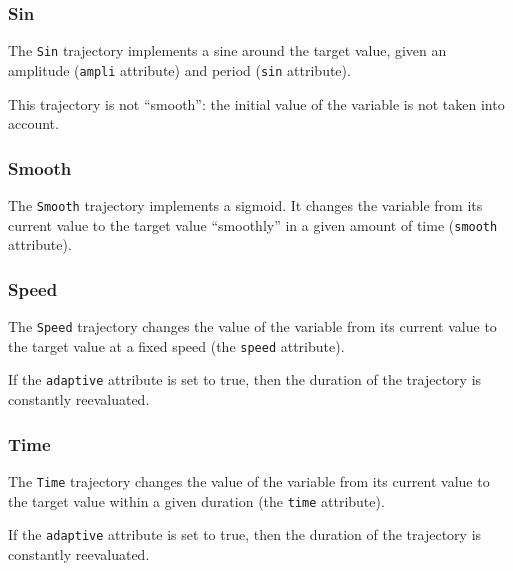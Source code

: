 
\subsubsection{Sin}

The \lstinline{Sin} trajectory implements a sine around the target
value, given an amplitude (\lstinline{ampli} attribute) and period
(\lstinline{sin} attribute).

This trajectory is not ``smooth'': the initial value of the variable
is not taken into account.


\subsubsection{Smooth}

The \lstinline{Smooth} trajectory implements a sigmoid.  It changes
the variable from its current value to the target value ``smoothly''
in a given amount of time (\lstinline{smooth} attribute).


\subsubsection{Speed}

The \lstinline{Speed} trajectory changes the value of the variable
from its current value to the target value at a fixed speed (the
\lstinline{speed} attribute).


If the \lstinline{adaptive} attribute is set to true, then the
duration of the trajectory is constantly reevaluated.


\subsubsection{Time}

The \lstinline{Time} trajectory changes the value of the variable from
its current value to the target value within a given duration (the
\lstinline{time} attribute).


If the \lstinline{adaptive} attribute is set to true, then the
duration of the trajectory is constantly reevaluated.


